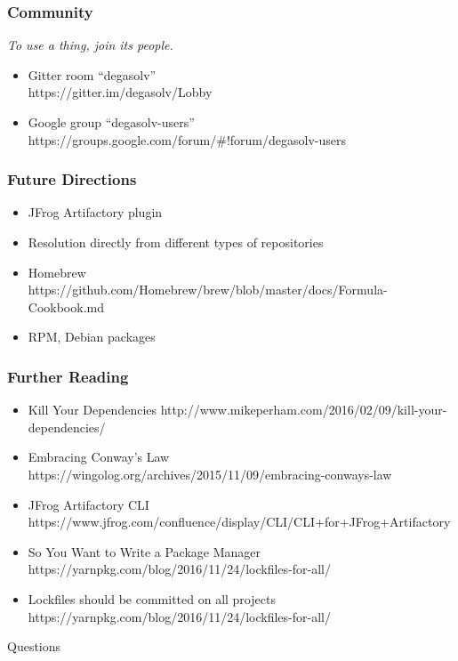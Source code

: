 \documentclass{beamer}
\begin{document}
\begin{frame}
  \frametitle{Community}
  \textit{To use a thing, join its people.}

  \break

  \begin{itemize}
  \item Gitter room ``degasolv'' \\
    {\small https://gitter.im/degasolv/Lobby}
  \item Google group ``degasolv-users'' \\
    {\small https://groups.google.com/forum/\#!forum/degasolv-users}
  \end{itemize}
\end{frame}
\begin{frame}
  \frametitle{Future Directions}
  \begin{itemize}
  \item JFrog Artifactory plugin
  \item Resolution directly from different types of repositories
  \item Homebrew \\
    {\small https://github.com/Homebrew/brew/blob/master/docs/Formula-Cookbook.md}
  \item RPM, Debian packages
  \end{itemize}
\end{frame}
\begin{frame}
  \frametitle{Further Reading}
  \begin{itemize}
  \item Kill Your Dependencies {\small http://www.mikeperham.com/2016/02/09/kill-your-dependencies/}
  \item Embracing Conway's Law {\small https://wingolog.org/archives/2015/11/09/embracing-conways-law}
  \item JFrog Artifactory CLI {\small https://www.jfrog.com/confluence/display/CLI/CLI+for+JFrog+Artifactory}
  \item So You Want to Write a Package Manager {\small https://yarnpkg.com/blog/2016/11/24/lockfiles-for-all/}
  \item Lockfiles should be committed on all projects {\small https://yarnpkg.com/blog/2016/11/24/lockfiles-for-all/}
  \end{itemize}
\end{frame}
\begin{frame}
  \centerline{\color{blue}\Large Questions}
\end{frame}
\end{document}
